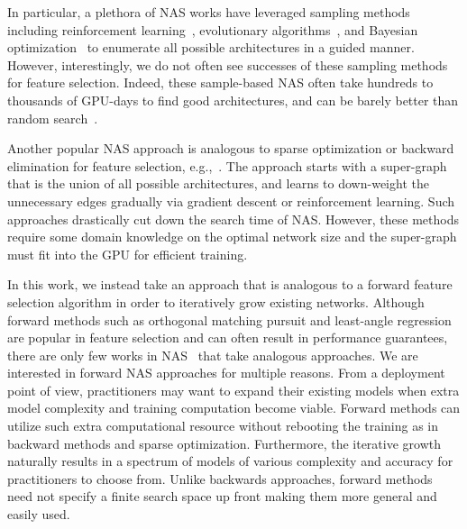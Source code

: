 In particular, a plethora of NAS works have leveraged sampling methods
including reinforcement learning~\citep{nas,NASCell,Liu2018HierNA},
evolutionary
algorithms~\citep{Real2017EvoNet,Real2018RegularizedEF,Elsken2018EfficientMN},
and Bayesian optimization~\citep{Kandasamy2018BNAS} to enumerate all
possible architectures in a guided manner.  However, interestingly, we
do not often see successes of these sampling methods for feature
selection.  Indeed, these sample-based NAS often take hundreds to
thousands of GPU-days to find good architectures, and can be barely
better than random search~\citep{Elsken2018NeuralAS}.

Another popular NAS approach is analogous to sparse optimization or
backward elimination for feature selection,
e.g.,~\citep{Liu2018DARTSDA,Pham2018EfficientNA,proxyless}.  The
approach starts with a super-graph that is the union of all possible
architectures, and learns to down-weight the unnecessary edges
gradually via gradient descent or reinforcement learning. Such
approaches drastically cut down the search time of NAS.  However,
these methods require some domain knowledge on the optimal network
size and the super-graph must fit into the GPU for efficient training.

In this work, we instead take an approach that is analogous to a
forward feature selection algorithm in order to iteratively grow
existing networks. Although forward methods such as orthogonal
matching pursuit and least-angle regression are popular in feature
selection and can often result in performance guarantees, there are
only few works in NAS~\citep{Liu2017ProgressiveNA} that take analogous
approaches.  We are interested in forward NAS approaches for multiple
reasons.  From a deployment point of view, practitioners may want to
expand their existing models when extra model complexity and training
computation become viable.  Forward methods can utilize such extra
computational resource without rebooting the training as in backward
methods and sparse optimization.  Furthermore, the iterative growth
naturally results in a spectrum of models of various complexity and
accuracy for practitioners to choose from.  Unlike backwards
approaches, forward methods need not specify a finite
search space up front making them more general and easily used.


